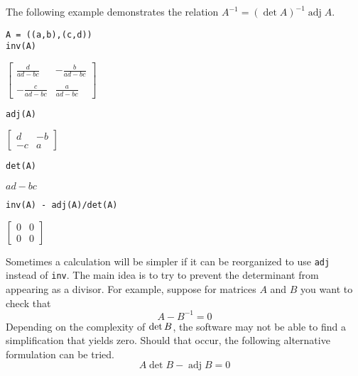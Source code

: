 \bigskip
\noindent
The following example demonstrates the relation
$A^{-1}=(\operatorname{det}A)^{-1}\operatorname{adj}A$.

{\color{blue}
\begin{verbatim}
A = ((a,b),(c,d))
inv(A)
\end{verbatim}
}

\noindent
$\displaystyle
\begin{bmatrix}
{\displaystyle \frac{d}{ad-bc}} & {\displaystyle -\frac{b}{ad-bc}}
\\
\\
{\displaystyle -\frac{c}{ad-bc}} & {\displaystyle \frac{a}{ad-bc}}
\end{bmatrix}
$

{\color{blue}
\begin{verbatim}
adj(A)
\end{verbatim}
}

\noindent
$\displaystyle
\begin{bmatrix}
d & -b
\\[1ex]
-c & a
\end{bmatrix}
$

{\color{blue}
\begin{verbatim}
det(A)
\end{verbatim}
}

\noindent
$ad-bc$

{\color{blue}
\begin{verbatim}
inv(A) - adj(A)/det(A)
\end{verbatim}
}

\noindent
$\displaystyle
\begin{bmatrix}
0 & 0
\\[1ex]
0 & 0
\end{bmatrix}
$

\bigskip
\noindent
Sometimes a calculation will be simpler if it can be reorganized to use
\verb$adj$ instead of \verb$inv$.
The main idea is to try to prevent the determinant from appearing as a
divisor.
For example, suppose for matrices $A$ and $B$ you want to check that
\begin{equation*}
{A}-{B}^{-1}=0
\end{equation*}
Depending on the complexity of $\mathop{\rm det}B$, the software
may not be able to find a simplification that yields zero.
Should that occur, the following alternative formulation can be tried.
\begin{equation*}
A\operatorname{det}B-\operatorname{adj}B=0
\end{equation*}
